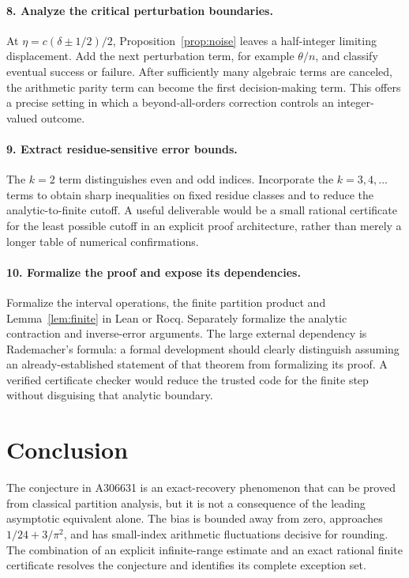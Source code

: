 \documentclass[11pt]{article}
\numberwithin{equation}{section}
\theoremstyle{definition}
\theoremstyle{remark}
\begin{document}
\paragraph{8. Analyze the critical perturbation boundaries.}
At $\eta=c(\delta\pm1/2)/2$, Proposition~\ref{prop:noise} leaves a
half-integer limiting displacement. Add the next perturbation term,
for example $\theta/n$, and classify eventual success or failure.
After sufficiently many algebraic terms are canceled, the arithmetic
parity term can become the first decision-making term. This offers a
precise setting in which a beyond-all-orders correction controls an
integer-valued outcome.

\paragraph{9. Extract residue-sensitive error bounds.}
The $k=2$ term distinguishes even and odd indices. Incorporate the
$k=3,4,\ldots$ terms to obtain sharp inequalities on fixed residue
classes and to reduce the analytic-to-finite cutoff. A useful deliverable
would be a small rational certificate for the least possible cutoff
in an explicit proof architecture, rather than merely a longer table
of numerical confirmations.

\paragraph{10. Formalize the proof and expose its dependencies.}
Formalize the interval operations, the finite partition product and
Lemma~\ref{lem:finite} in Lean or Rocq. Separately formalize the analytic
contraction and inverse-error arguments. The large external dependency
is Rademacher's formula: a formal development should clearly distinguish
assuming an already-established statement of that theorem from
formalizing its proof. A verified certificate checker would reduce the
trusted code for the finite step without disguising that analytic
boundary.

\section{Conclusion}
The conjecture in A306631 is an exact-recovery phenomenon that can be
proved from classical partition analysis, but it is not a consequence
of the leading asymptotic equivalent alone. The bias is bounded away
from zero, approaches $1/24+3/\pi^2$, and has small-index arithmetic
fluctuations decisive for rounding. The combination of an explicit
infinite-range estimate and an exact rational finite certificate
resolves the conjecture and identifies its complete exception set.
\end{document}
